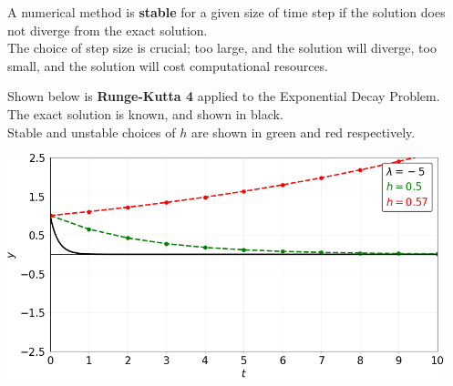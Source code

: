 \documentclass[a0paper,portrait]{baposter}
\begin{document}
\begin{poster}
{\par A numerical method is \textbf{stable} for a given size of time step if the solution does not diverge from the exact solution.\\
The choice of step size is crucial; too large, and the solution will diverge, too small, and the solution will cost computational resources.\\

\par Shown below is \textbf{Runge-Kutta 4} applied to the Exponential Decay Problem.\\
The exact solution is known, and shown in black.\\
Stable and unstable choices of $h$ are shown in green and red respectively.\\
\begin{center}
\includegraphics[width=0.95\textwidth]{Exponential Decay/Exact vs Method/Runge-Kutta 4 real.png}
\end{center}
}


\end{poster}
\end{document}

